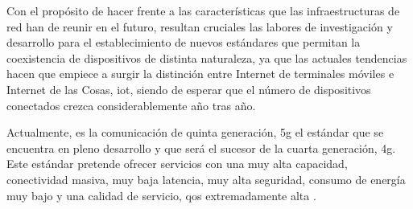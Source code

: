 Con el propósito de hacer frente a las características que las infraestructuras de red han de reunir en el futuro, resultan cruciales las labores de investigación y desarrollo para el establecimiento de nuevos estándares que permitan la coexistencia de dispositivos de distinta naturaleza, ya que las actuales tendencias hacen que empiece a surgir la distinción entre Internet de terminales móviles e Internet de las Cosas, \ac{iot}, siendo de esperar que el número de dispositivos conectados crezca considerablemente año tras año.


Actualmente, es la comunicación de quinta generación, \ac{5g} el estándar que se encuentra en pleno desarrollo y que será el sucesor de la cuarta generación, \ac{4g}. Este estándar pretende ofrecer servicios con una muy alta capacidad, conectividad masiva, muy baja latencia, muy alta seguridad, consumo de energía muy bajo y una calidad de servicio, \ac{qos} extremadamente alta \cite{comparative5G}.

\begin{table}[h]
\centering
\caption{Objetivos de 5G \cite{cognitive5G}.}
\label{tab:5gfeatures}
\end{table}

